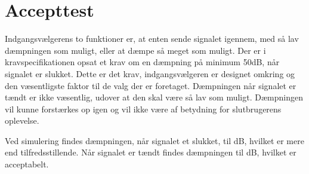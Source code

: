 \section{Accepttest}
Indgangsvælgerens to funktioner er, at enten sende signalet igennem, med så lav dæmpningen som muligt, eller at dæmpe så meget som muligt. Der er i kravspecifikationen opsat et krav om en dæmpning på minimum 50dB, når signalet er slukket. Dette er det krav, indgangsvælgeren er designet omkring og den væsentligste faktor til de valg der er foretaget. Dæmpningen når signalet er tændt er ikke væsentlig, udover at den skal være så lav som muligt. Dæmpningen vil kunne forstærkes op igen og vil ikke være af betydning for slutbrugerens oplevelse.

Ved simulering findes dæmpningen, når signalet et slukket, til dB, hvilket er mere end tilfredsstillende. Når signalet er tændt findes dæmpningen til dB, hvilket er acceptabelt.